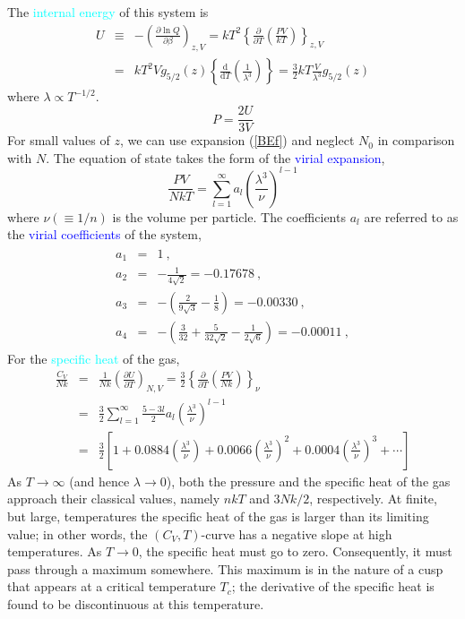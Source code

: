 \documentclass[12pt,a4paper]{article}
\newcommand{\dif}{\mathrm{d}}
\begin{document}
The \textcolor{cyan}{internal energy} of this system is 
\begin{eqnarray}
\nonumber U &\equiv& -\left(\frac{\partial \ln \mathit{Q}}{\partial \beta}  \right)_{z, V} = kT^2 \left\{\frac{\partial }{\partial T} \left(\frac{PV}{k T} \right) \right\}_{z,V}  \\
&=& kT^2V g_{5/2}(z) \left\{\frac{\dif }{\dif T} \left(\frac{1}{\lambda^3} \right) \right\} = \frac{3}{2} kT \frac{V}{\lambda^3} g_{5/2}(z)
\end{eqnarray}
where $\lambda \propto T^{-1/2}$. 
\begin{equation}
P = \frac{2U}{3V}
\end{equation}
For small values of $z$, we can use expansion (\ref{BEf}) and neglect $N_0$ in comparison with $N$. The equation of state takes the form of the \textcolor{blue}{virial expansion},
\begin{equation}
\frac{PV}{NkT} = \sum_{l=1}^\infty a_l \left(\frac{\lambda^3}{\nu}  \right)^{l-1}
\end{equation}
where $\nu (\equiv 1/n)$ is the volume per particle. The coefficients $a_l$ are referred to as the \textcolor{blue}{virial coefficients} of the system,
\begin{eqnarray}
\begin{split}
a_1 &=& 1 ~,\\
a_2 &=& -\frac{1}{4\sqrt{2}} = -0.17678 ~,\\
a_3 &=& -\left(\frac{2}{9\sqrt{3}} -\frac{1}{8}\right) = -0.00330 ~, \\
a_4 &=& -\left(\frac{3}{32} +\frac{5}{32\sqrt{2} } -\frac{1}{2\sqrt{6} }\right) = -0.00011 ~,
\end{split}
\end{eqnarray}
For the \textcolor{cyan}{specific heat} of the gas,
\begin{eqnarray}
\nonumber \frac{C_V}{Nk} &=& \frac{1}{Nk} \left(\frac{\partial U}{\partial T} \right)_{N, V} = \frac{3}{2} \left\{\frac{\partial }{\partial T} \left(\frac{PV}{Nk} \right) \right\}_\nu \\
\nonumber &=& \frac{3}{2} \sum_{l=1}^\infty \frac{5-3l}{2} a_l \left(\frac{\lambda^3}{\nu}  \right)^{l-1} \\
&=& \frac{3}{2} \left[1+0.0884 \left(\frac{\lambda^3}{\nu}  \right) +0.0066 \left(\frac{\lambda^3}{\nu}  \right)^2 + 0.0004\left(\frac{\lambda^3}{\nu}  \right)^3 +\cdots \right]
\end{eqnarray}
As $T \rightarrow \infty$ (and hence $\lambda \rightarrow 0$), both the pressure and the specific heat of the gas approach their classical values, namely $nkT$ and $3 Nk/2$, respectively. At finite, but large, temperatures the specific heat of the gas is larger than its limiting value; in other words, the $(C_V, T)$-curve has a negative slope at high temperatures. As $T \rightarrow 0$, the specific heat must go to zero. Consequently, it must pass through a maximum somewhere. This maximum is in the nature of a cusp that appears at a critical temperature $T_c$; the derivative of the specific heat is found to be discontinuous at this temperature.
\end{document}
